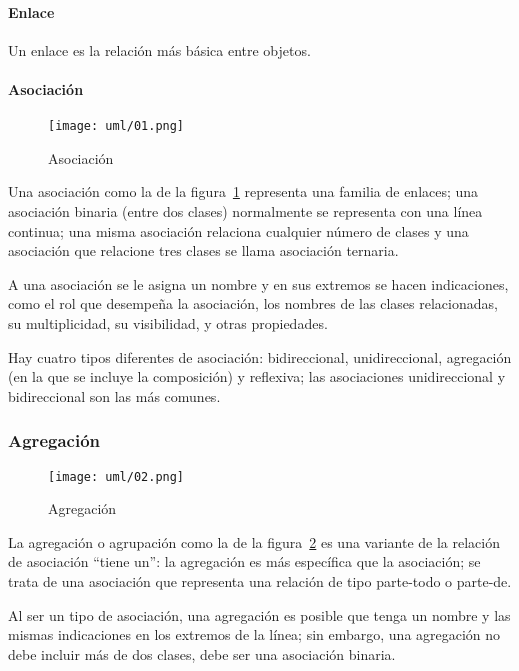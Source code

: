 \paragraph*{Enlace}
Un enlace es la relación más básica entre objetos.

\paragraph*{Asociación}



\begin{figure}[H] 
    \centering
    \texttt{[image: uml/01.png]}
    \caption{Asociación}
    \label{img:uml-asociacion}
\end{figure}

Una asociación como la de la figura~\ref{img:uml-asociacion} representa una familia de enlaces; una asociación binaria (entre dos clases) normalmente se representa con una línea continua; una misma asociación relaciona cualquier número de clases y una asociación que relacione tres clases se llama asociación ternaria.

A una asociación se le asigna un nombre y en sus extremos se hacen indicaciones, como el rol que desempeña la asociación, los nombres de las clases relacionadas, su multiplicidad, su visibilidad, y otras propiedades.

Hay cuatro tipos diferentes de asociación: bidireccional, unidireccional, agregación (en la que se incluye la composición) y reflexiva; las asociaciones unidireccional y bidireccional son las más comunes.


\subsubsection*{Agregación}


\begin{figure}[H] 
    \centering
    \texttt{[image: uml/02.png]}
    \caption{Agregación}
    \label{img:uml-agregacion}
\end{figure}


La agregación o agrupación como la de la figura~\ref{img:uml-agregacion} es una variante de la relación de asociación ``tiene un'': la agregación es más específica que la asociación; se trata de una asociación que representa una relación de tipo parte-todo o parte-de.


Al ser un tipo de asociación, una agregación es posible que tenga un nombre y las mismas indicaciones en los extremos de la línea; sin embargo, una agregación no debe incluir más de dos clases, debe ser una asociación binaria.


